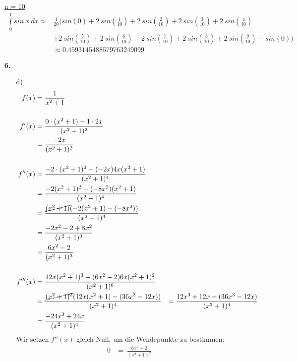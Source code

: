 \documentclass[a4paper,11pt]{article}
\begin{document}
\begin{enumerate}
            \underline{n = 10}
            \begin{align*}
            \int\limits_{0}^{1} sin \ x \ dx \approx &\frac{1}{20}\Bigg(sin(0) + 2 \ sin \left(\frac{1}{10}\right)+ 2 \ sin \left(\frac{2}{10}\right)+ 2 \ sin \left(\frac{3}{10}\right)+ 2 \ sin \left(\frac{4}{10}\right) \\ 
            &+ 2 \ sin \left(\frac{5}{10}\right)+ 2 \ sin \left(\frac{6}{10}\right)+ 2 \ sin \left(\frac{7}{10}\right)+ 2 \ sin \left(\frac{8}{10}\right)+ 2 \ sin \left(\frac{9}{10}\right)+  sin(0)\Bigg) \\[0.5cm]
            &\approx 0.4593145488579763249099
            \end{align*}
        \item[\textbf{6.}]
            \begin{enumerate}
                \item [d)]
                \begin{align*}
                    f(x) &= \frac{1}{x^2+1} \\[0.5cm]
                    f'(x) &= \frac{0 \cdot (x^2+1) - 1 \cdot 2x}{(x^2+1)^2} \\
                    &= \frac{-2x}{(x^2+1)^2} \\[0.5cm]
                    f''(x) &= \frac{-2 \cdot (x^2 +1)^2 - (-2x)4x(x^2+1)}{(x^2+1)^4} \\
                    &= \frac{-2(x^2+1)^2 - (-8x^2)(x^2+1)}{(x^2+1)^4} \\
                    &= \frac{\cancel{(x^2+1)}(-2(x^2+1)-(-8x^2))}{(x^2+1)^3} \\
                    &= \frac{-2x^2-2+8x^2}{(x^2+1)^3} \\
                    &= \frac{6x^2-2}{(x^2+1)^3} \\[0.5cm]
                    f'''(x) &= \frac{12x(x^2+1)^3 -(6x^2-2)6x(x^2+1)^2}{(x^2+1)^6} \\
                    &= \frac{\cancel{(x^2+1)^2}(12x(x^2+1)-(36x^3-12x))}{(x^2+1)^4}
                    &= \frac{12x^3+12x-(36x^3-12x)}{(x^2+1)^4} \\
                    &= \frac{-24x^3+24x}{(x^2+1)^4} \\
                \end{align*}
                Wir setzen $f''(x)$ gleich Null, um die Wendepunkte zu bestimmen:
                \begin{align*}
                    0 &=\ \frac{6x^2-2}{(x^2+1)^3}\\

\end{align*}
\end{enumerate}
\end{enumerate}
\end{document}
